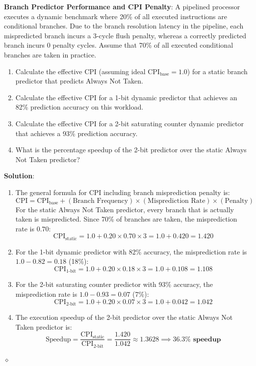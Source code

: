 \begin{problem}
\textbf{Branch Predictor Performance and CPI Penalty}:
A pipelined processor executes a dynamic benchmark where 20\% of all executed instructions are conditional branches. Due to the branch resolution latency in the pipeline, each mispredicted branch incurs a 3-cycle flush penalty, whereas a correctly predicted branch incurs 0 penalty cycles.
Assume that 70\% of all executed conditional branches are taken in practice.
\begin{enumerate}
    \item Calculate the effective CPI (assuming ideal $\text{CPI}_{\text{base}} = 1.0$) for a static branch predictor that predicts Always Not Taken.
    \item Calculate the effective CPI for a 1-bit dynamic predictor that achieves an 82\% prediction accuracy on this workload.
    \item Calculate the effective CPI for a 2-bit saturating counter dynamic predictor that achieves a 93\% prediction accuracy.
    \item What is the percentage speedup of the 2-bit predictor over the static Always Not Taken predictor?
\end{enumerate}

\textbf{Solution}:
\begin{enumerate}
    \item The general formula for CPI including branch misprediction penalty is:
    \[
    \text{CPI} = \text{CPI}_{\text{base}} + (\text{Branch Frequency}) \times (\text{Misprediction Rate}) \times (\text{Penalty})
    \]
    For the static Always Not Taken predictor, every branch that is actually taken is mispredicted. Since 70\% of branches are taken, the misprediction rate is $0.70$:
    \[
    \text{CPI}_{\text{static}} = 1.0 + 0.20 \times 0.70 \times 3 = 1.0 + 0.420 = 1.420
    \]
    \item For the 1-bit dynamic predictor with 82\% accuracy, the misprediction rate is $1.0 - 0.82 = 0.18$ (18\%):
    \[
    \text{CPI}_{\text{1-bit}} = 1.0 + 0.20 \times 0.18 \times 3 = 1.0 + 0.108 = 1.108
    \]
    \item For the 2-bit saturating counter predictor with 93\% accuracy, the misprediction rate is $1.0 - 0.93 = 0.07$ (7\%):
    \[
    \text{CPI}_{\text{2-bit}} = 1.0 + 0.20 \times 0.07 \times 3 = 1.0 + 0.042 = 1.042
    \]
    \item The execution speedup of the 2-bit predictor over the static Always Not Taken predictor is:
    \[
    \text{Speedup} = \frac{\text{CPI}_{\text{static}}}{\text{CPI}_{\text{2-bit}}} = \frac{1.420}{1.042} \approx 1.3628 \implies \mathbf{36.3\% \text{ speedup}}
    \]
\end{enumerate}
$\diamond$
\end{problem}

